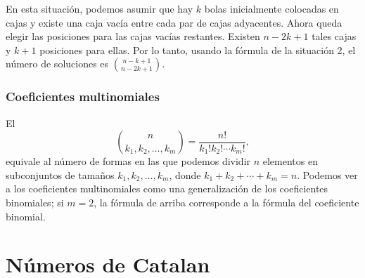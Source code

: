 \begin{center}
\end{center}

En esta situación, podemos asumir que hay $k$ bolas inicialmente colocadas
en cajas y existe una caja vacía entre cada par de cajas adyacentes. Ahora
queda elegir las posiciones para las cajas vacías restantes. Existen
$n-2k+1$ tales cajas y $k+1$ posiciones para ellas. Por lo tanto, usando la
fórmula de la situación 2, el número de soluciones es $\binom{n-k+1}{n-2k+1}$.

\subsubsection{Coeficientes multinomiales}


El 
\[ \binom{n}{k_1,k_2,\ldots,k_m} = \frac{n!}{k_1! k_2! \cdots k_m!}, \]
equivale al número de formas en las que podemos dividir $n$ elementos en
subconjuntos de tamaños $k_1,k_2,\ldots,k_m$, donde $k_1+k_2+\cdots+k_m=n$.
Podemos ver a los coeficientes multinomiales como una generalización de los
coeficientes binomiales; si $m=2$, la fórmula de arriba corresponde a la
fórmula del coeficiente binomial.

\section{Números de Catalan}

